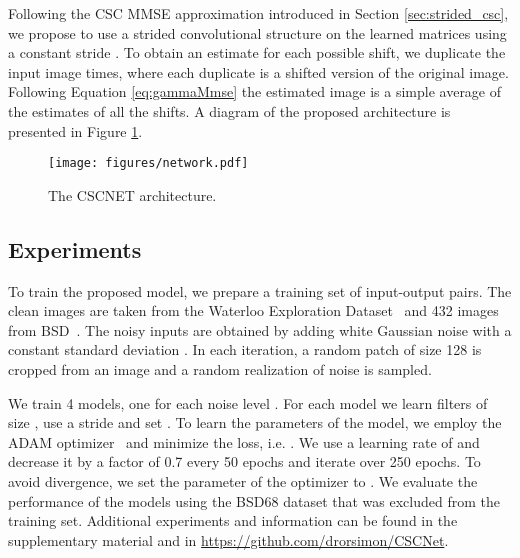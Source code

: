 \documentclass{article}
\begin{document}
Following the CSC MMSE approximation introduced in Section \ref{sec:strided_csc}, we propose to use a strided convolutional structure on the learned matrices using a constant stride . To obtain an estimate for each possible shift, we duplicate the input image  times, where each duplicate is a shifted version of the original image. Following Equation \eqref{eq:gammaMmse} the estimated image is a simple average of the estimates of all the shifts. A diagram of the proposed architecture is presented in Figure \ref{fig:architecture}.

\begin{figure}[t]
    \centering
    \texttt{[image: figures/network.pdf]}
    \caption{The CSCNET architecture.}
    \label{fig:architecture}
    \vspace{-2mm}
\end{figure}

\subsection{Experiments}
To train the proposed model, we prepare a training set of input-output pairs. The clean images are taken from the Waterloo Exploration Dataset~\cite{ma2017waterloo} and 432 images from BSD~\cite{amfm_pami2011}. The noisy inputs are obtained by adding white Gaussian noise with a constant standard deviation . In each iteration, a random patch of size 128 is cropped from an image and a random realization of noise is sampled.

We train 4 models, one for each noise level . For each model we learn  filters of size , use a stride  and set . To learn the parameters of the model, we employ the ADAM optimizer~\cite{kingma2014adam} and minimize the  loss, i.e. . We use a learning rate of  and decrease it by a factor of 0.7 every 50 epochs and iterate over 250 epochs. To avoid divergence, we set the  parameter of the optimizer to . We evaluate the performance of the models using the BSD68 dataset that was excluded from the training set. Additional experiments and information can be found in the supplementary material and in \url{https://github.com/drorsimon/CSCNet}.
\end{document}
